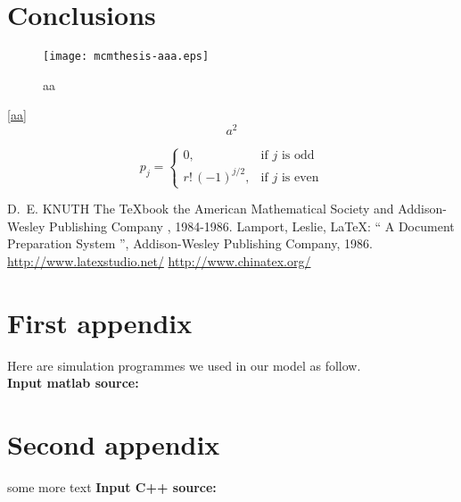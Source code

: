\documentclass{mcmthesis}
\begin{document}
\section{Conclusions}

\begin{figure}[h]
  \small
  \centering
  \texttt{[image: mcmthesis-aaa.eps]}
  \caption{aa} \label{fig:aa}
\end{figure}

\lipsum[8] \eqref{aa}
\begin{equation}
  a^2 \label{aa}
\end{equation}


\[
  p_{j}=\begin{cases} 0,              & \text{if $j$ is odd}  \\
    r!\,(-1)^{j/2}, & \text{if $j$ is even}
  \end{cases}
\]

\begin{thebibliography}{99}
   D.~E. KNUTH   The \TeX{}book  the American
  Mathematical Society and Addison-Wesley
  Publishing Company , 1984-1986.
  Lamport, Leslie,  \LaTeX{}: `` A Document Preparation System '',
  Addison-Wesley Publishing Company, 1986.
  \url{http://www.latexstudio.net/}
  \url{http://www.chinatex.org/}
\end{thebibliography}

\begin{appendices}

  \section{First appendix}

  \lipsum[13]

  Here are simulation programmes we used in our model as follow.\\

  \textbf{\textcolor[rgb]{0.98,0.00,0.00}{Input matlab source:}}
  

  \section{Second appendix}

  some more text \textcolor[rgb]{0.98,0.00,0.00}{\textbf{Input C++ source:}}
  

\end{appendices}
\end{document}
